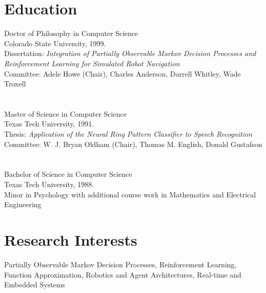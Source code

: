 \documentclass[11pt]{resume}
\begin{document}

\pagestyle{fancyplain}
\thispagestyle{empty}

\address{2624 West Dana \\ Lubbock, Texas 79415 \\ (806) 763--0577\\
         pyeatt@cs.ttu.edu }
\line


\section{Education}
  {Doctor of Philosophy in Computer Science}
  {\\Colorado State University, 1999. \\
  Dissertation:  {\it Integration of Partially Observable Markov
Decision Processes and Reinforcement Learning for Simulated Robot 
Navigation}\\ 
  Committee: Adele Howe (Chair), Charles Anderson, 
  Darrell Whitley, Wade Troxell }
   
\section{} 
  {Master of Science in Computer Science}    
  {\\Texas Tech University, 1991. \\
  Thesis:   {\it Application of the Neural Ring Pattern Classifier
  to Speech Recognition}\\
  Committee: W. J. Bryan Oldham (Chair), Thomas M. English, Donald Gustafson}
   
\section{} 
  {Bachelor of Science in Computer Science}    
  {\\Texas Tech University, 1988. \\
  Minor in Psychology with additional course work in Mathematics and 
  Electrical Engineering}

\section{Research Interests}  
  {}
  {Partially Observable Markov Decision Processes,
   Reinforcement Learning, Function Approximation, Robotics and
   Agent Architectures, Real-time and Embedded Systems }
\end{document}
